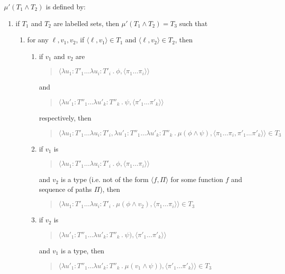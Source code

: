 $\mu'(T_1\wedge T_2)$ is defined by:
\begin{enumerate} 
 
\item if $T_1$ and $T_2$ are labelled sets, then $\mu'(T_1\wedge
  T_2)=T_3$ such that
\begin{enumerate} 
 
\item for any $\ell,v_1,v_2$, if $\langle\ell,v_1\rangle\in T_1$ and
  $\langle\ell,v_2\rangle\in T_2$, then 

\begin{enumerate} 
 
\item if $v_1$ and $v_2$ are
\begin{quote}
  $\langle\lambda u_1\!\!:\!\!T'_1\ldots\lambda
  u_i\!\!:\!\!T'_i\ .\ \phi,\langle\pi_1\ldots\pi_i\rangle\rangle$
  \end{quote}
  and
  \begin{quote}
    $\langle\lambda u'_1\!\!:\!\!T''_1\ldots\lambda
  u'_k\!\!:\!\!T''_k\ .\ \psi,\langle\pi'_1\ldots\pi'_k\rangle\rangle$
\end{quote}
respectively, then
\begin{quote}
$\langle\lambda u_1\!\!:\!\!T'_1\ldots\lambda
  u_i\!\!:\!\!T'_i,\lambda u'_1\!\!:\!\!T''_1\ldots\lambda
  u'_k\!\!:\!\!T''_k\ .\ \mu(\phi\wedge\psi), \langle\pi_1\ldots\pi_i,\pi'_1\ldots\pi'_k\rangle\rangle\in T_3$
\end{quote}

\item if $v_1$ is
  \begin{quote}
$\langle\lambda u_1\!\!:\!\!T'_1\ldots\lambda
u_i\!\!:\!\!T'_i\ .\ \phi,\langle\pi_1\ldots\pi_i\rangle\rangle$
\end{quote}
and $v_2$ is a
  type (i.e. not of the form $\langle f,\Pi\rangle$ for some function
  $f$ and sequence of paths $\Pi$), then
  \begin{quote}
    $\langle\lambda u_1\!\!:\!\!T'_1\ldots\lambda
  u_i\!\!:\!\!T'_i\ .\ \mu(\phi\wedge
  v_2),\langle\pi_1\ldots\pi_i\rangle\rangle\in T_3$
\end{quote}

\item if $v_2$ is
  \begin{quote}
    $\langle\lambda u'_1\!\!:\!\!T''_1\ldots\lambda
  u'_k\!\!:\!\!T''_k\ .\
  \psi),\langle\pi'_1\ldots\pi'_k\rangle\rangle$
\end{quote}
and $v_1$
is a type, then
\begin{quote}
  $\langle\lambda u'_1\!\!:\!\!T''_1\ldots\lambda
  u'_k\!\!:\!\!T''_k\ .\ \mu(v_1\wedge\psi)),\langle\pi'_1\ldots\pi'_k\rangle\rangle\in
  T_3$
  \end{quote}


\end{enumerate}
\end{enumerate}
\end{enumerate}
